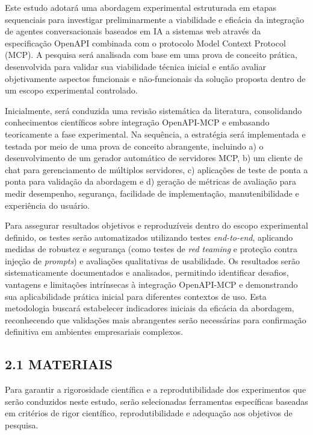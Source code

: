 \documentclass[
]{article}
\begin{document}
Este estudo adotará uma abordagem experimental estruturada em etapas
sequenciais para investigar preliminarmente a viabilidade e eficácia da
integração de agentes conversacionais baseados em IA a sistemas web
através da especificação OpenAPI combinada com o protocolo Model Context
Protocol (MCP). A pesquisa será analisada com base em uma prova de
conceito prática, desenvolvida para validar sua viabilidade técnica
inicial e então avaliar objetivamente aspectos funcionais e
não-funcionais da solução proposta dentro de um escopo experimental
controlado.

Inicialmente, será conduzida uma revisão sistemática da literatura,
consolidando conhecimentos científicos sobre integração OpenAPI-MCP e
embasando teoricamente a fase experimental. Na sequência, a estratégia
será implementada e testada por meio de uma prova de conceito
abrangente, incluindo a) o desenvolvimento de um gerador automático de
servidores MCP, b) um cliente de chat para gerenciamento de múltiplos
servidores, c) aplicações de teste de ponta a ponta para validação da
abordagem e d) geração de métricas de avaliação para medir desempenho,
segurança, facilidade de implementação, manutenibilidade e experiência
do usuário.

Para assegurar resultados objetivos e reproduzíveis dentro do escopo
experimental definido, os testes serão automatizados utilizando testes
\emph{end-to-end}, aplicando medidas de robustez e segurança (como
testes de \emph{red teaming} e proteção contra injeção de
\emph{prompts}) e avaliações qualitativas de usabilidade. Os resultados
serão sistematicamente documentados e analisados, permitindo identificar
desafios, vantagens e limitações intrínsecas à integração OpenAPI-MCP e
demonstrando sua aplicabilidade prática inicial para diferentes
contextos de uso. Esta metodologia buscará estabelecer indicadores
iniciais da eficácia da abordagem, reconhecendo que validações mais
abrangentes serão necessárias para confirmação definitiva em ambientes
empresariais complexos.

\subsection{2.1 MATERIAIS}\label{materiais}

Para garantir a rigorosidade científica e a reprodutibilidade dos
experimentos que serão conduzidos neste estudo, serão selecionadas
ferramentas específicas baseadas em critérios de rigor científico,
reprodutibilidade e adequação aos objetivos de pesquisa.
\end{document}
